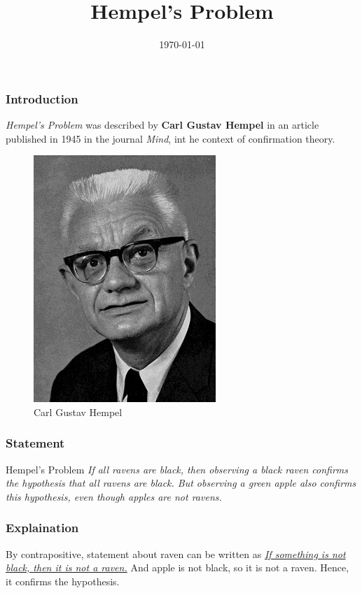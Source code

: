 \documentclass[
    10pt,
    aspectratio=169,
    xcolor={dvipsnames},
]{beamer}
\title{Hempel's Problem}
\author{\presenter}
\date{\today}
\begin{document}
\maketitle

\begin{frame}
    \frametitle{Introduction}
    \textit{Hempel's Problem} was described by \textbf{Carl Gustav Hempel} in an article published in 1945 in the journal \textit{Mind}, int he context of confirmation theory.

    \begin{figure}[h]
        \centering
        \includegraphics[scale=0.3]{Carl_Gustav_Hempel.jpeg}
        \caption{Carl Gustav Hempel}
    \end{figure}
\end{frame}

\begin{frame}
    \frametitle{Statement}
    \begin{block}{Hempel's Problem}
        \textit{If all ravens are black, then observing a black raven confirms the hypothesis that all ravens are black. But observing a green apple also confirms this  hypothesis, even though apples are not ravens.}
    \end{block}
\end{frame}

\begin{frame}
    \frametitle{Explaination}
    By contrapositive, statement about raven can be written as \ul{\textit{If something is not black, then it is not a raven.}} And apple is not black, so it is not a raven. Hence, it confirms the hypothesis.
\end{frame}
\end{document}
